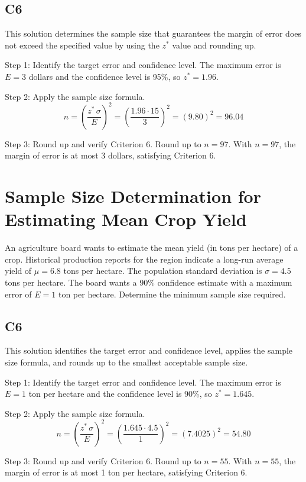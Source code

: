 \begin{ExamProblems}
		\subsection*{C6}
		This solution determines the sample size that guarantees the margin of error does not exceed the specified value by using the $z^*$ value and rounding up.
		
		Step 1: Identify the target error and confidence level. The maximum error is $E = 3$ dollars and the confidence level is 95\%, so $z^* = 1.96$.
		
		Step 2: Apply the sample size formula.
		\[
		n = \left(\frac{z^*\,\sigma}{E}\right)^2
		= \left(\frac{1.96 \cdot 15}{3}\right)^2
		= \left(9.80\right)^2
		= 96.04
		\]
		
		Step 3: Round up and verify Criterion 6. Round up to $n = 97$. With $n=97$, the margin of error is at most 3 dollars, satisfying Criterion 6.
		
		\item
		\section{Sample Size Determination for Estimating Mean Crop Yield}
		An agriculture board wants to estimate the mean yield (in tons per hectare) of a crop. Historical production reports for the region indicate a long-run average yield of $\mu = 6.8$ tons per hectare. The population standard deviation is $\sigma = 4.5$ tons per hectare. The board wants a 90\% confidence estimate with a maximum error of $E = 1$ ton per hectare. Determine the minimum sample size required.
		
		\subsection*{C6}
		This solution identifies the target error and confidence level, applies the sample size formula, and rounds up to the smallest acceptable sample size.
		
		Step 1: Identify the target error and confidence level. The maximum error is $E = 1$ ton per hectare and the confidence level is 90\%, so $z^* = 1.645$.
		
		Step 2: Apply the sample size formula.
		\[
		n = \left(\frac{z^*\,\sigma}{E}\right)^2
		= \left(\frac{1.645 \cdot 4.5}{1}\right)^2
		= \left(7.4025\right)^2
		= 54.80
		\]
		
		Step 3: Round up and verify Criterion 6. Round up to $n = 55$. With $n=55$, the margin of error is at most 1 ton per hectare, satisfying Criterion 6.
		

\end{ExamProblems}
